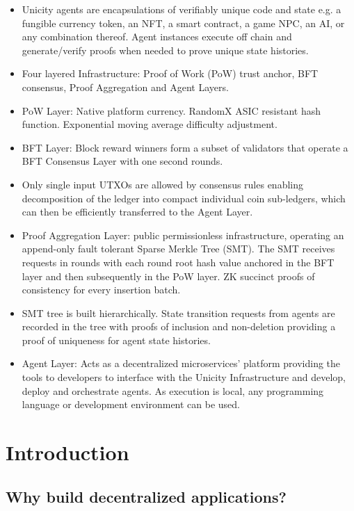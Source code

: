 \documentclass{article}
\begin{document}
\begin{itemize}
    \item Unicity agents are encapsulations of verifiably unique code and state e.g. a fungible currency token, an NFT, a smart contract,  a game NPC, an AI, or any combination thereof. Agent instances execute off chain and generate/verify proofs when needed to prove unique state histories.
    \item  Four layered Infrastructure: Proof of Work (PoW) trust anchor, BFT consensus, Proof Aggregation and Agent Layers.
    \item PoW Layer: Native platform currency. RandomX ASIC resistant hash function. Exponential moving average difficulty adjustment.
    \item BFT Layer: Block reward winners form a subset of validators that operate a BFT Consensus Layer with one second rounds.
    \item Only single input UTXOs are allowed by consensus rules enabling decomposition of the ledger into compact individual coin sub-ledgers, which can then be efficiently transferred to the Agent Layer.
    \item Proof Aggregation Layer: public permissionless infrastructure, operating an append-only fault tolerant Sparse Merkle Tree (SMT). The SMT receives requests in rounds with each round root hash value anchored in the BFT layer and then subsequently in the PoW layer. ZK succinct proofs of consistency for every insertion batch.
    \item SMT tree is built hierarchically. State transition requests from agents are recorded in the tree with proofs of inclusion and non-deletion providing a proof of uniqueness for agent state histories.
    \item Agent Layer: Acts as a decentralized microservices' platform providing the tools to developers to interface with the Unicity Infrastructure and develop, deploy and orchestrate agents. As execution is local, any programming language or development environment can be used.
\end{itemize}


\section{Introduction}

\subsection{Why build decentralized applications?}
\end{document}
